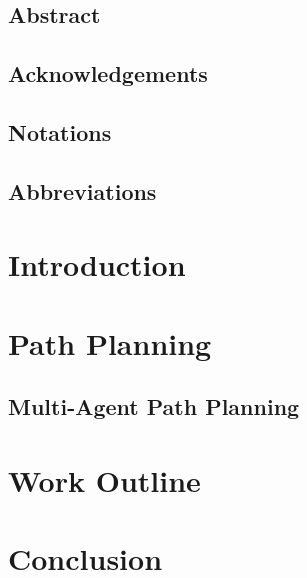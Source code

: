 \documentclass{thesisreport}
\begin{document}
  
 
\section*{Abstract}
 
\section*{Acknowledgements}
 

\section*{Notations}
 

\section*{Abbreviations}
 
 
\listoffigures
 
\listoftables
 
\tableofcontents
 
 
\chapter*{Introduction}
 
 
\chapter{Path Planning}
 
\section{Multi-Agent Path Planning} 
 
\chapter{Work Outline}
 
  
 \chapter*{Conclusion}
 
  
\newpage


 

 
 
 
 
\end{document}
